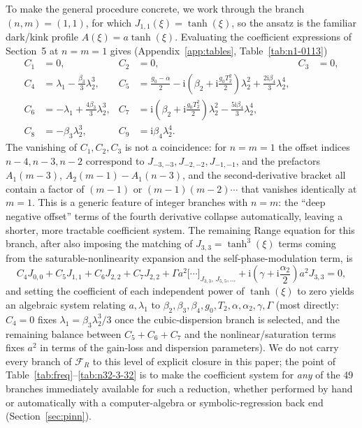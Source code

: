\documentclass[11pt]{article}
\newcommand{\ii}{\mathrm{i}}
\begin{document}
To make the general procedure concrete, we work through the branch $(n,m)=(1,1)$, for
which $J_{1,1}(\xi)=\tanh(\xi)$, so the ansatz is the familiar dark/kink profile
$A(\xi)=a\tanh(\xi)$. Evaluating the coefficient expressions of Section~5 at $n=m=1$
gives (Appendix~\ref{app:tables}, Table~\ref{tab:n1-0113})
\begin{align}
C_1&=0, & C_2&=0, & C_3&=0, \\
C_4&=\lambda_1-\frac{\beta_3}{3}\lambda_2^3, &
C_5&=\frac{g_0-\alpha}{2}-\ii\!\left(\beta_2+\ii\frac{g_0T_2^2}{2}\right)\lambda_2^2+\frac{2\ii\beta_4}{3}\lambda_2^4, \\
C_6&=-\lambda_1+\frac{4\beta_3}{3}\lambda_2^3, &
C_7&=\ii\!\left(\beta_2+\ii\frac{g_0T_2^2}{2}\right)\lambda_2^2-\frac{5\ii\beta_4}{3}\lambda_2^4, \\
C_8&=-\beta_3\lambda_2^3, & C_9&=\ii\beta_4\lambda_2^4.
\end{align}
The vanishing of $C_1,C_2,C_3$ is not a coincidence: for $n=m=1$ the offset indices
$n-4,n-3,n-2$ correspond to $J_{-3,-3},J_{-2,-2},J_{-1,-1}$, and the prefactors $A_1(m-3)$,
$A_2(m-1)-A_1(n-3)$, and the second-derivative bracket all contain a factor of
$(m-1)$ or $(m-1)(m-2)\cdots$ that vanishes identically at $m=1$. This is a generic
feature of integer branches with $n=m$: the ``deep negative offset'' terms of the fourth
derivative collapse automatically, leaving a shorter, more tractable coefficient system.
The remaining Range equation for this branch, after also imposing the matching of
$J_{3,3}=\tanh^3(\xi)$ terms coming from the saturable-nonlinearity expansion and the
self-phase-modulation term, is
\begin{equation}
C_4J_{0,0}+C_5J_{1,1}+C_6J_{2,2}+C_7J_{2,2}
+\Gamma a^2\big[\cdots\big]_{J_{3,3},\,J_{5,5},\dots}
+\ii\!\left(\gamma+\ii\frac{\alpha_2}{2}\right)a^2J_{3,3}=0,
\end{equation}
and setting the coefficient of each independent power of $\tanh(\xi)$ to zero yields an
algebraic system relating $a,\lambda_1$ to $\beta_2,\beta_3,\beta_4,g_0,T_2,\alpha,\alpha_2,\gamma,\Gamma$
(most directly: $C_4=0$ fixes $\lambda_1=\beta_3\lambda_2^3/3$ once the cubic-dispersion
branch is selected, and the remaining balance between $C_5+C_6+C_7$ and the
nonlinear/saturation terms fixes $a^2$ in terms of the gain-loss and dispersion
parameters). We do not carry every branch of $\mathcal{F}_R$ to this level of explicit
closure in this paper; the point of Table~\ref{tab:freq}--\ref{tab:n32-3-32} is to make the
coefficient system for \emph{any} of the 49 branches immediately available for such a
reduction, whether performed by hand or automatically with a computer-algebra or
symbolic-regression back end (Section~\ref{sec:pinn}).
\end{document}
